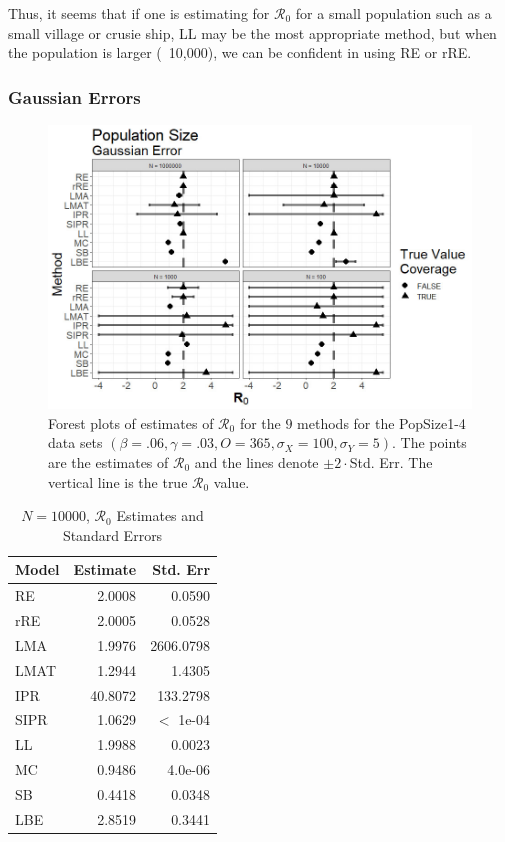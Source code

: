 \documentclass[12pt]{article}
\newcommand{\xxsir}{\ensuremath{9} } %
\newcommand{\rr}{\ensuremath{\mathcal{R}_0}}
\begin{document}
Thus, it seems that if one is estimating for $\rr$ for a small population such as a small village or crusie ship, LL may be the most appropriate method, but when the population is larger (~10,000), we can be confident in using RE or rRE.

\subsubsection{Gaussian Errors}

\begin{figure}[H]
	\centering
	\includegraphics[scale=0.5]{images/popsize_n.jpg}
	\caption{Forest plots of estimates of $\rr$ for the \xxsir methods for the PopSize1-4 data sets $(\beta=.06, \gamma=.03, O=365, \sigma_X=100, \sigma_Y=5)$.  The points are the estimates of $\rr$ and the lines denote $\pm 2\cdot $Std. Err.  The vertical line is the true $\rr$ value.}\label{fig:inits-res2}
\end{figure}

\begin{table}[H]
	
	\centering
	\begin{tabular}[t]{l|r|r}
		\hline
		Model & Estimate & Std. Err\\
		\hline
		RE & 2.0008 & 0.0590\\
		\hline
		rRE & 2.0005 & 0.0528\\
		\hline
		LMA & 1.9976 & 2606.0798\\
		\hline
		LMAT & 1.2944 & 1.4305\\
		\hline
		IPR & 40.8072 & 133.2798\\
		\hline
		SIPR & 1.0629 &  $<$ 1e-04\\
		\hline
		LL & 1.9988 & 0.0023\\
		\hline
		MC & 0.9486 & 4.0e-06\\
		\hline
		SB & 0.4418 & 0.0348\\
		\hline
		LBE & 2.8519 & 0.3441\\
		\hline
	\end{tabular}
\caption{$N = 10000$, $\rr$ Estimates and Standard Errors}\label{tab:n1-res2}
\end{table}
\end{document}
